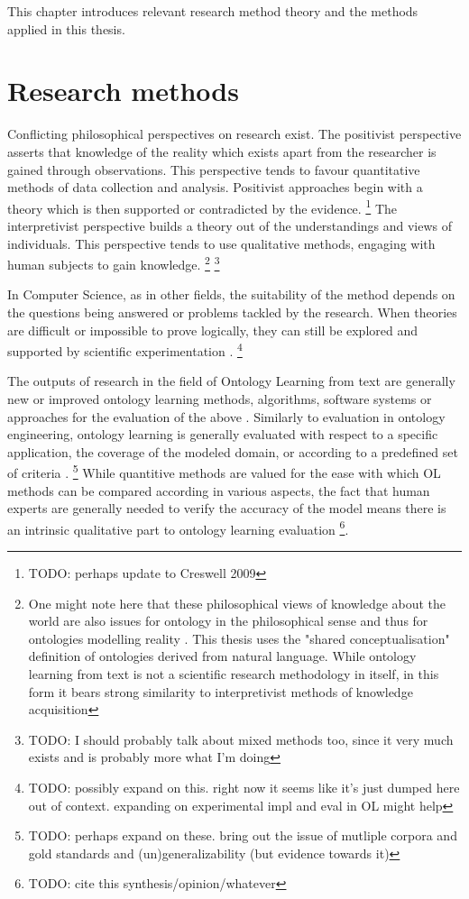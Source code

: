 \documentclass[a4paper]{report}
\newcommand{\todo}[1]{\footnote{{\color{red} TODO: #1}}}
\begin{document}
This chapter introduces relevant research method theory and the methods applied in this thesis.

\section{Research methods}
\label{sec:methods:research}
Conflicting philosophical perspectives on research exist.
The positivist perspective asserts that knowledge of the reality which exists apart from the researcher is gained through observations.
This perspective tends to favour quantitative methods of data collection and analysis.
Positivist approaches begin with a theory which is then supported or contradicted by the evidence.
\cite[p.6-7]{creswell2003research}\todo{perhaps update to Creswell 2009}
The interpretivist perspective builds a theory out of the understandings and views of individuals.
This perspective tends to use qualitative methods, engaging with human subjects to gain knowledge.
\cite[p.7-9]{creswell2003research}
\footnote{One might note here that these philosophical views of knowledge about the world are also issues for ontology in the philosophical sense and thus for ontologies modelling reality \cite[p.6]{creswell2003research}\cite{sep-hermeneutics}.
This thesis uses the "shared conceptualisation" definition of ontologies derived from natural language.
While ontology learning from text is not a scientific research methodology in itself, in this form it bears strong similarity to interpretivist methods of knowledge acquisition}
\todo{I should probably talk about mixed methods too, since it very much exists and is probably more what I'm doing}

In Computer Science, as in other fields, the suitability  of the method depends on the questions being answered or problems tackled by the research.
When theories are difficult or impossible to prove logically, they can still be explored and supported by scientific experimentation \cite{Blomqvist09Thesis,Crnkovic2002SciMethCS}.
\todo{possibly expand on this. right now it seems like it's just dumped here out of context. expanding on experimental impl and eval in OL might help}

The outputs of research in the field of Ontology Learning from text are generally new or improved ontology learning methods, algorithms, software systems or approaches for the evaluation of the above \cite{Wong11Survey}.
Similarly to evaluation in ontology engineering, ontology learning is generally evaluated with respect to a specific application, the coverage of the modeled domain, or according to a predefined set of criteria \cite{Wong11Survey}.
\todo{perhaps expand on these. bring out the issue of mutliple corpora and gold standards and (un)generalizability (but evidence towards it)}
While quantitive methods are valued for the ease with which OL methods can be compared according in various aspects, the fact that human experts are generally needed to verify the accuracy of the model means there is an intrinsic qualitative part to ontology learning evaluation \todo{cite this synthesis/opinion/whatever}.
\end{document}
